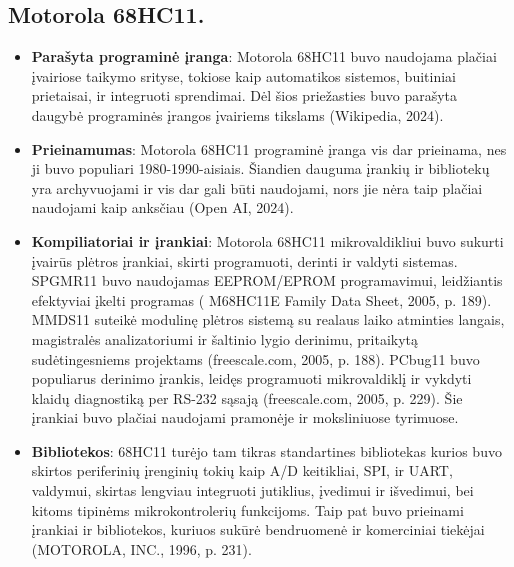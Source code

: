 \documentclass[a4paper,12pt]{article}
\begin{document}
\subsection{Motorola 68HC11.}
\begin{itemize}
    \item \textbf{Parašyta programinė įranga}: Motorola 68HC11 buvo naudojama plačiai įvairiose taikymo srityse, tokiose kaip automatikos sistemos, buitiniai prietaisai, ir integruoti sprendimai. Dėl šios priežasties buvo parašyta daugybė programinės įrangos įvairiems tikslams (Wikipedia, 2024).
    \item \textbf{Prieinamumas}: Motorola 68HC11 programinė įranga vis dar prieinama, nes ji
buvo populiari 1980-1990-aisiais. Šiandien dauguma įrankių ir bibliotekų yra archyvuojami ir vis dar gali būti naudojami, nors jie nėra taip plačiai naudojami kaip
anksčiau (Open AI, 2024).
    \item \textbf{Kompiliatoriai ir įrankiai}: Motorola 68HC11 mikrovaldikliui buvo sukurti įvairūs plėtros įrankiai, skirti programuoti, derinti ir valdyti sistemas. SPGMR11 buvo naudojamas EEPROM/EPROM programavimui, leidžiantis efektyviai įkelti programas ( M68HC11E Family
 Data Sheet, 2005, p. 189). MMDS11 suteikė modulinę plėtros sistemą su realaus laiko atminties langais, magistralės analizatoriumi ir šaltinio lygio derinimu, pritaikytą sudėtingesniems projektams (freescale.com, 2005, p. 188). PCbug11 buvo populiarus derinimo įrankis, leidęs programuoti mikrovaldiklį ir vykdyti klaidų diagnostiką per RS-232 sąsają (freescale.com, 2005, p. 229). Šie įrankiai buvo plačiai naudojami pramonėje ir moksliniuose tyrimuose.
    \item \textbf{Bibliotekos}: 68HC11 turėjo tam tikras standartines bibliotekas kurios buvo skirtos periferinių įrenginių tokių kaip A/D keitikliai, SPI, ir UART, valdymui, skirtas lengviau integruoti jutiklius, įvedimui ir išvedimui, bei kitoms tipinėms mikrokontrolerių funkcijoms. Taip pat buvo prieinami įrankiai ir bibliotekos, kuriuos sukūrė bendruomenė ir komerciniai tiekėjai (MOTOROLA, INC., 1996, p. 231).
\end{itemize}

\end{document}
